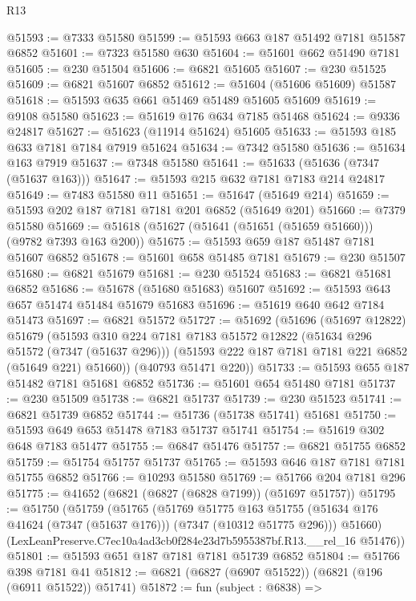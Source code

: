 \begin{lexlean}{R13}
\begin{coremodule}
@51593 := @7333 @51580
@51599 := @51593 @663 @187 @51492 @7181 @51587 @6852
@51601 := @7323 @51580 @630
@51604 := @51601 @662 @51490 @7181
@51605 := @230 @51504
@51606 := @6821 @51605
@51607 := @230 @51525
@51609 := @6821 @51607 @6852
@51612 := @51604 (@51606 @51609) @51587
@51618 := @51593 @635 @661 @51469 @51489 @51605 @51609
@51619 := @9108 @51580
@51623 := @51619 @176 @634 @7185 @51468
@51624 := @9336 @24817
@51627 := @51623 (@11914 @51624) @51605
@51633 := @51593 @185 @633 @7181 @7184 @7919 @51624
@51634 := @7342 @51580
@51636 := @51634 @163 @7919
@51637 := @7348 @51580
@51641 := @51633 (@51636 (@7347 (@51637 @163)))
@51647 := @51593 @215 @632 @7181 @7183 @214 @24817
@51649 := @7483 @51580 @11
@51651 := @51647 (@51649 @214)
@51659 := @51593 @202 @187 @7181 @7181 @201 @6852 (@51649 @201)
@51660 := @7379 @51580
@51669 := @51618 (@51627 (@51641 (@51651 (@51659 @51660))) (@9782 @7393 @163 @200))
@51675 := @51593 @659 @187 @51487 @7181 @51607 @6852
@51678 := @51601 @658 @51485 @7181
@51679 := @230 @51507
@51680 := @6821 @51679
@51681 := @230 @51524
@51683 := @6821 @51681 @6852
@51686 := @51678 (@51680 @51683) @51607
@51692 := @51593 @643 @657 @51474 @51484 @51679 @51683
@51696 := @51619 @640 @642 @7184 @51473
@51697 := @6821 @51572
@51727 := @51692
    (@51696
      (@51697 @12822)
      @51679
      (@51593
        @310
        @224
        @7181
        @7183
        @51572
        @12822
        (@51634 @296 @51572 (@7347 (@51637 @296)))
        (@51593 @222 @187 @7181 @7181 @221 @6852 (@51649 @221) @51660))
      (@40793 @51471 @220))
@51733 := @51593 @655 @187 @51482 @7181 @51681 @6852
@51736 := @51601 @654 @51480 @7181
@51737 := @230 @51509
@51738 := @6821 @51737
@51739 := @230 @51523
@51741 := @6821 @51739 @6852
@51744 := @51736 (@51738 @51741) @51681
@51750 := @51593 @649 @653 @51478 @7183 @51737 @51741
@51754 := @51619 @302 @648 @7183 @51477
@51755 := @6847 @51476
@51757 := @6821 @51755 @6852
@51759 := @51754 @51757 @51737
@51765 := @51593 @646 @187 @7181 @7181 @51755 @6852
@51766 := @10293 @51580
@51769 := @51766 @204 @7181 @296
@51775 := @41652 (@6821 (@6827 (@6828 @7199)) (@51697 @51757))
@51795 := @51750
    (@51759
      (@51765
        (@51769
          @51775
          @163
          @51755
          (@51634 @176 @41624 (@7347 (@51637 @176)))
          (@7347 (@10312 @51775 @296)))
        @51660)
      (LexLeanPreserve.C7ec10a4ad3cb0f284e23d7b5955387bf.R13.__rel_16 @51476))
@51801 := @51593 @651 @187 @7181 @7181 @51739 @6852
@51804 := @51766 @398 @7181 @41
@51812 := @6821 (@6827 (@6907 @51522)) (@6821 (@196 (@6911 @51522)) @51741)
@51872 := fun (subject : @6838) =>

\end{coremodule}
\end{lexlean}
